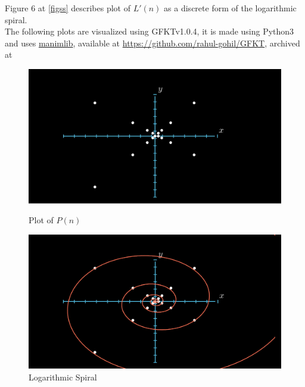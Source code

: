 \documentclass{article}
\begin{document}
Figure 6 at \ref{figss} describes plot of $L'(n)$ as a discrete form of the logarithmic spiral.\\
The following plots are visualized using GFKTv1.0.4\cite{rahulgohil2020}, it is made using Python3 and uses \href{https://github.com/3b1b/manim}{manimlib}, available at \href{https://github.com/rahul-gohil/GFKT}{https://github.com/rahul-gohil/GFKT}, archived at 
\begin{figure}[t]
	\centering
	\begin{minipage}{0.45\textwidth}
		\centering
		\includegraphics[scale=0.23, trim={3cm 0 6cm 0}, clip]{images/GFKT3.png}
		\caption{Plot of $P(n)$}
	\end{minipage}\hfill
	\begin{minipage}{0.45\textwidth}
		\centering
		\includegraphics[scale=0.23, trim={3cm 0 6cm 0}, clip]{images/GFKT4.png}
		\caption{Logarithmic Spiral}
	\end{minipage}
\end{figure}
\end{document}
